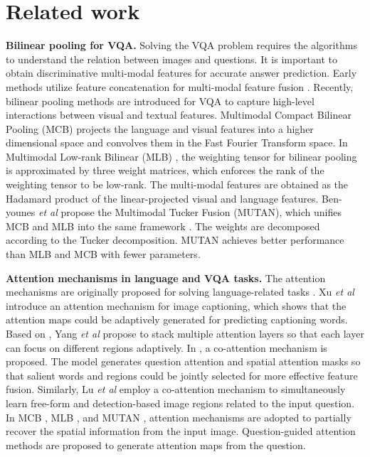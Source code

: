 \documentclass[runningheads]{llncs}
\begin{document}
\section{Related work}
\textbf{Bilinear pooling for VQA.} Solving the VQA problem requires the algorithms to understand the relation between images and questions. It is important to obtain discriminative multi-modal features for accurate answer prediction. Early methods utilize feature concatenation \cite{zhou2015simple} for multi-modal feature fusion \cite{lin2015bilinear,li2017identity,li2017person}. Recently, bilinear pooling methods are introduced for VQA to capture high-level interactions between visual and textual features. Multimodal Compact Bilinear Pooling (MCB) \cite{fukui2016multimodal} projects the language and visual features into a higher dimensional space and convolves them in the Fast Fourier Transform space. In Multimodal Low-rank Bilinear (MLB) \cite{kim2016hadamard}, the weighting tensor for bilinear pooling is approximated by three weight matrices, which enforces the rank of the weighting tensor to be low-rank. The multi-modal features are obtained as the Hadamard product of the linear-projected visual and language features. Ben-younes \textit{et al} \cite{ben2017mutan} propose the Multimodal Tucker Fusion (MUTAN), which unifies MCB and MLB into the same framework . The weights are decomposed according to the Tucker decomposition. MUTAN achieves better performance than MLB and MCB with fewer parameters. 

\textbf{Attention mechanisms in language and VQA tasks.} The attention mechanisms \cite{xu2016ask,li2018diversity} are originally proposed for solving language-related tasks \cite{bahdanau2014neural}. Xu \textit{et al} \cite{xu2016ask} introduce an attention mechanism for image captioning, which shows that the attention maps could be adaptively generated for predicting captioning words. Based on \cite{xu2016ask}, Yang \textit{et al} \cite{yang2016stacked} propose to stack multiple attention layers so that each layer can focus on different regions adaptively. In \cite{lu2016hierarchical}, a co-attention mechanism is proposed. The model generates question attention and spatial attention masks so that salient words and regions could be jointly selected for more effective feature fusion. 
Similarly, Lu \textit{et al} \cite{lu2018coatt} employ a co-attention mechanism to simultaneously learn free-form and detection-based image regions related to the input question.
In MCB \cite{fukui2016multimodal}, MLB \cite{kim2016hadamard}, and MUTAN \cite{ben2017mutan}, attention mechanisms are adopted to partially recover the spatial information from the input image. Question-guided attention methods \cite{chen2015abc,xu2016ask} are proposed to generate attention maps from the question. 
\end{document}
